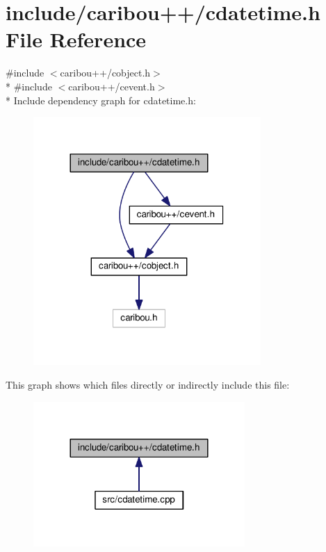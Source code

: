 \section{include/caribou++/cdatetime.h File Reference}
\label{cdatetime_8h}
{\ttfamily \#include $<$caribou++/cobject.\+h$>$}\\*
{\ttfamily \#include $<$caribou++/cevent.\+h$>$}\\*
Include dependency graph for cdatetime.\+h\+:
\nopagebreak
\begin{figure}[H]
\begin{center}
\leavevmode
\includegraphics[width=245pt]{cdatetime_8h__incl}
\end{center}
\end{figure}
This graph shows which files directly or indirectly include this file\+:
\nopagebreak
\begin{figure}[H]
\begin{center}
\leavevmode
\includegraphics[width=228pt]{cdatetime_8h__dep__incl}
\end{center}
\end{figure}
